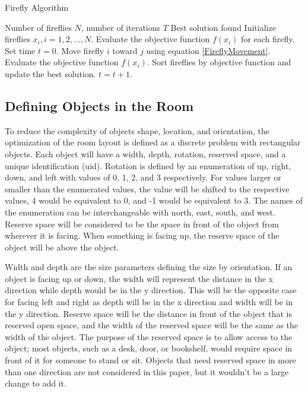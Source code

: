 \documentclass[sigconf,authordraft]{acmart}
\begin{document}
    \begin{algorithm}
    \caption{Firefly Algorithm}
    \label{FireflyAlgorithm}
    \begin{algorithmic}
        \renewcommand{\algorithmicrequire}{\textbf{Input:}}
        \renewcommand{\algorithmicensure}{\textbf{Output:}}
        \REQUIRE Number of fireflies $N$, number of iterations $T$
        \ENSURE Best solution found
        \STATE Initialize fireflies $x_i, i = 1, 2, ..., N$.
        \STATE Evaluate the objective function $f(x_i)$ for each firefly.
        \STATE Set time $t = 0$.
                        \STATE Move firefly $i$ toward $j$ using equation \ref{FireflyMovement}.
                        \STATE Evaluate the objective function $f(x_i)$.
                    \ENDIF
                \ENDFOR
            \ENDFOR
            \STATE Sort fireflies by objective function and update the best solution.
            \STATE $t = t + 1$.
        \ENDWHILE
        \end{algorithmic}
    \end{algorithm}

    \subsection{Defining Objects in the Room}
    To reduce the complexity of objects shape, location, and orientation, the optimization of the room layout is defined as a discrete problem with rectangular objects. Each object will have a width, depth, rotation, reserved space, and a unique identification (uid). Rotation is defined by an enumeration of up, right, down, and left with values of 0, 1, 2, and 3 respectively. For values larger or smaller than the enumerated values, the value will be shifted to the respective values, 4 would be equivalent to 0, and -1 would be equivalent to 3. The names of the enumeration can be interchangeable with north, east, south, and west. Reserve space will be considered to be the space in front of the object from wherever it is facing. When something is facing up, the reserve space of the object will be above the object.
    
    Width and depth are the size parameters defining the size by orientation. If an object is facing up or down, the width will represent the distance in the x direction while depth would be in the y direction. This will be the opposite case for facing left and right as depth will be in the x direction and width will be in the y direction. Reserve space will be the distance in front of the object that is reserved open space, and the width of the reserved space will be the same as the width of the object. The purpose of the reserved space is to allow access to the object; most objects, such as a desk, door, or bookshelf, would require space in front of it for someone to stand or sit. Objects that need reserved space in more than one direction are not considered in this paper, but it wouldn’t be a large change to add it.
    
\end{document}
